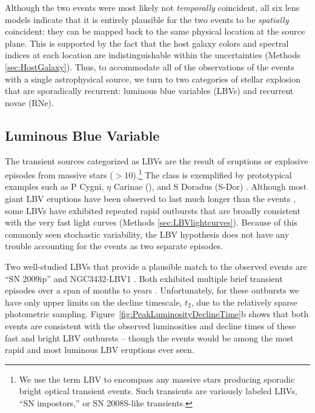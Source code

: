 
Although the two events were most likely not {\it temporally}
coincident, all six lens models indicate that it is entirely
plausible for the two \spock events to be {\it spatially} coincident: they
can be mapped back to the same physical location at the source
plane. This is supported by the fact that the host galaxy colors and
spectral indices at each \spock location are indistinguishable within
the uncertainties (Methods \ref{sec:HostGalaxy}).  
Thus, to accommodate all of the observations of the \spock events with
a single astrophysical source, we turn to two categories of
stellar explosion that are sporadically recurrent: luminous blue
variables (LBVs) and recurrent novae (RNe).

\subsection{Luminous Blue Variable}

The transient sources categorized as LBVs are the result of eruptions
or explosive episodes from massive stars ($>10$\Msun).\footnote{We use
  the term LBV to encompass any massive stars producing sporadic
  bright optical transient events. Such
  transients are variously labeled LBVs, ``SN impostors,'' or SN
  2008S-like transients.}   The class is
exemplified by prototypical examples such as P Cygni, $\eta$ Carinae
(\etacar), and S Doradus (S-Dor) \citep[for recent overviews of the
  LBV class, see][]{Smith:2011b, Kochanek:2012}.  Although most giant
LBV eruptions have been observed to last much longer than the \spock
events \citep{Smith:2011b}, some LBVs have exhibited repeated rapid
outbursts that are broadly consistent with the very fast \spock light
curves (Methods \ref{sec:LBVlightcurves}). Because of this commonly
seen stochastic variability, the LBV hypothesis does not have any
trouble accounting for the \spock events as two separate episodes.

Two well-studied LBVs that provide a plausible match to the observed
\spock events are ``SN 2009ip'' \citep{Maza:2009} and NGC3432-LBV1
\citep{Pastorello:2010}.  Both exhibited multiple brief transient
episodes over a span of months to years \citep[e.g.,][]{Miller:2009,
  Li:2009, Berger:2009, Drake:2010, Pastorello:2010}.  Unfortunately,
for these outbursts we have only upper limits on the decline
timescale, $t_2$, due to the relatively sparse photometric sampling.
Figure~\ref{fig:PeakLuminosityDeclineTime}b shows that both \spock
events are consistent with the observed luminosities and decline times
of these fast and bright LBV outbursts -- though the \spock events
would be among the most rapid and most luminous LBV eruptions ever
seen.

